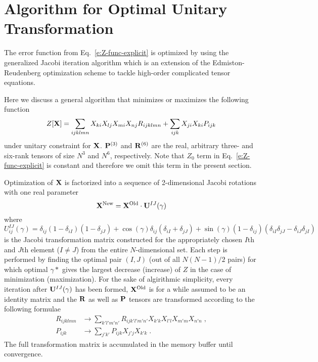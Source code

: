 \documentclass[aip,graphicx]{revtex4-1}
\begin{document}
\section{\label{a:X-mat}Algorithm for Optimal Unitary Transformation}

The error function from Eq.~\eqref{e:Z-func-explicit} is optimized by using the generalized Jacobi iteration algorithm
which is an extension of the Edmiston\hyp{}Reudenberg optimization scheme to tackle high\hyp{}order
complicated tensor equations. 

Here we discuss a general algorithm that minimizes or maximizes the following function
%
\begin{equation} \label{e:a.Z}
 Z[{\bf X}] = \sum_{ijklmn} X_{ki} X_{lj} X_{mi} X_{nj} R_{ijklmn}
             +\sum_{ijk}    X_{ji} X_{ki} P_{ijk}
\end{equation}
%
under unitary constraint for ${\bf X}$. ${\bf P}^{(3)}$ and ${\bf R}^{(6)}$ are the real, arbitrary three\hyp{} and
six\hyp{}rank tensors of size $N^3$ and $N^6$, respectively. Note that $Z_0$ term 
in Eq.~\eqref{e:Z-func-explicit} is constant
and therefore we omit this term in the present section.

Optimization of $ {\bf X} $ is factorized into a sequence of 2-dimensional Jacobi rotations with one real parameter
%
\begin{equation}
 {\bf X}^{\rm New} = {\bf X}^{\rm Old} \cdot {\bf U}^{IJ}(\gamma)
\end{equation}
%
where 
%
\begin{equation} \label{e:a.U}
 U_{ij}^{IJ}(\gamma) = \delta_{ij}
                       \left( 1-\delta_{iI} \right)
                       \left( 1-\delta_{jJ} \right) 
                       +
                       \cos(\gamma) \delta_{ij} \left( \delta_{iI} + \delta_{jJ} \right)
                       + 
                       \sin(\gamma) \left( 1-\delta_{ij} \right) 
                       \left( \delta_{iI} \delta_{jJ} - \delta_{iJ} \delta_{jI}\right)
\end{equation}
%
is the Jacobi transformation matrix constructed for the appropriately chosen $ I$th and $ J$th element ($I\neq J$)
from the entire $ N$-dimensional set. Each step is performed by finding the optimal pair
$(I,J)$ (out of all $N(N-1)/2$ pairs) for which optimal $\gamma*$ gives the largest decrease (increase) of $Z$ 
in the case of minimization (maximization). 
For the sake of algirithmic simplicity, 
every iteration after $ {\bf U}^{IJ}(\gamma) $ has been formed, $ {\bf X}^{\rm Old} $ 
is for a while assumed to be an identity matrix and the $ {\bf R} $ as well as $ {\bf P} $ tensors 
are transformed according to the following formulae
%
\begin{subequations}\label{e:a.rp-transformations}
 \begin{align}
 R_{ijklmn} &\rightarrow \sum_{k'l'm'n'} R_{ijk'l'm'n'} X_{k'k} X_{l'l} X_{m'm} X_{n'n} \;, \\
 P_{ijk}    &\rightarrow \sum_{j'k'}     P_{ijk} X_{j'j} X_{k'k}  \;.
 \end{align}
\end{subequations}
%
The full transformation matrix is accumulated in the memory buffer until convergence.
\end{document}
